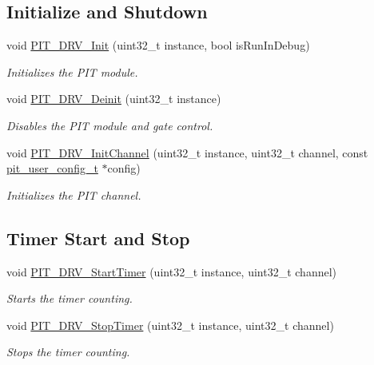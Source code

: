 \subsection*{Initialize and Shutdown}
\begin{DoxyCompactItemize}
\item 
void \hyperlink{group__pit__driver_gade7db6b50ff1fc8209b295f89f775a9d}{P\+I\+T\+\_\+\+D\+R\+V\+\_\+\+Init} (uint32\+\_\+t instance, bool is\+Run\+In\+Debug)
\begin{DoxyCompactList}\small\item\em Initializes the P\+IT module. \end{DoxyCompactList}\item 
void \hyperlink{group__pit__driver_gab5a3126edf78349fe4845c48bfbb6978}{P\+I\+T\+\_\+\+D\+R\+V\+\_\+\+Deinit} (uint32\+\_\+t instance)
\begin{DoxyCompactList}\small\item\em Disables the P\+IT module and gate control. \end{DoxyCompactList}\item 
void \hyperlink{group__pit__driver_ga25cbdbfdd630d0e96f7e18b2d03f62a8}{P\+I\+T\+\_\+\+D\+R\+V\+\_\+\+Init\+Channel} (uint32\+\_\+t instance, uint32\+\_\+t channel, const \hyperlink{group__pit__driver_ga05f144da781ddb765b1ec9ac8887c7eb}{pit\+\_\+user\+\_\+config\+\_\+t} $\ast$config)
\begin{DoxyCompactList}\small\item\em Initializes the P\+IT channel. \end{DoxyCompactList}\end{DoxyCompactItemize}
\subsection*{Timer Start and Stop}
\begin{DoxyCompactItemize}
\item 
void \hyperlink{group__pit__driver_ga1443f423c01d741dbe7ad9fd81eb9f59}{P\+I\+T\+\_\+\+D\+R\+V\+\_\+\+Start\+Timer} (uint32\+\_\+t instance, uint32\+\_\+t channel)
\begin{DoxyCompactList}\small\item\em Starts the timer counting. \end{DoxyCompactList}\item 
void \hyperlink{group__pit__driver_ga368d1b78f6c2fb6b351f797b724007a6}{P\+I\+T\+\_\+\+D\+R\+V\+\_\+\+Stop\+Timer} (uint32\+\_\+t instance, uint32\+\_\+t channel)
\begin{DoxyCompactList}\small\item\em Stops the timer counting. \end{DoxyCompactList}\end{DoxyCompactItemize}
